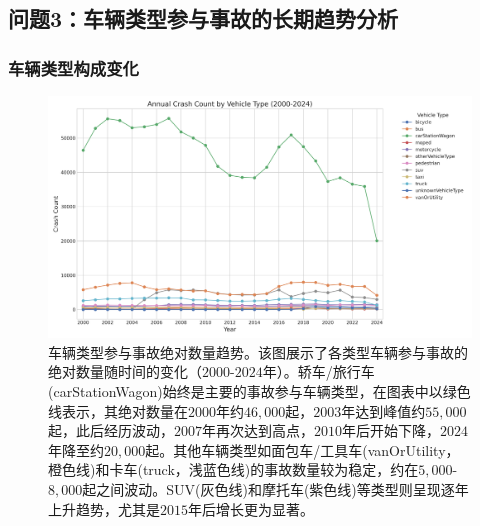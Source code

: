 \documentclass[12pt,a4paper]{article}
\begin{document}
\subsection{问题3：车辆类型参与事故的长期趋势分析}

\subsubsection{车辆类型构成变化}

\begin{figure}[H]
\centering
\includegraphics[height=0.25\textheight]{vehicle_type_trends.png}
\caption{车辆类型参与事故绝对数量趋势。该图展示了各类型车辆参与事故的绝对数量随时间的变化（$2000$-$2024$年）。轿车/旅行车(carStationWagon)始终是主要的事故参与车辆类型，在图表中以绿色线表示，其绝对数量在$2000$年约$46,000$起，$2003$年达到峰值约$55,000$起，此后经历波动，$2007$年再次达到高点，$2010$年后开始下降，$2024$年降至约$20,000$起。其他车辆类型如面包车/工具车(vanOrUtility，橙色线)和卡车(truck，浅蓝色线)的事故数量较为稳定，约在$5,000$-$8,000$起之间波动。SUV(灰色线)和摩托车(紫色线)等类型则呈现逐年上升趋势，尤其是$2015$年后增长更为显著。}
\label{fig:vehicle_type_trends}
\end{figure}
\end{document}
